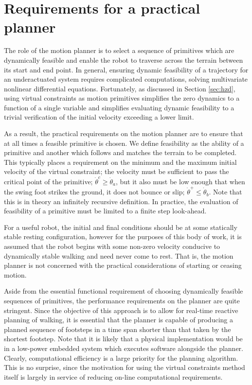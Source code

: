 \section{Requirements for a practical planner}
The role of the motion planner is to select a sequence of primitives which are dynamically feasible and enable the robot to traverse across the terrain between its start and end point. In general, ensuring dynamic feasibility of a trajectory for an underactuated system requires complicated computations, solving multivariate nonlinear differential equations. Fortunately, as discussed in Section \ref{sec:hzd}, using virtual constraints as motion primitives simplifies the zero dynamics to a function of a single variable and simplifies evaluating dynamic feasibility to a trivial verification of the initial velocity exceeding a lower limit.

As a result, the practical requirements on the motion planner are to ensure that at all times a feasible primitive is chosen. We define feasibility as the ability of a primitive and another which follows and matches the terrain to be completed. This typically places a requirement on the minimum and the maximum initial velocity of the virtual constraint; the velocity must be sufficient to pass the critical point of the primitive; $\dot{\theta}^c \geq \dot{\theta}_a$, but it also must be low enough that when the swing foot strikes the ground, it does not bounce or slip; $\dot{\theta}^+ \leq \dot{\theta}_b$. Note that this is in theory an infinitely recursive definition. In practice, the evaluation of feasibility of a primitive must be limited to a finite step look-ahead.

For a useful robot, the initial and final conditions should be at some statically stable resting configuration, however for the purposes of this body of work, it is assumed that the robot begins with some non-zero velocity conducive to dynamically stable walking and need never come to rest. That is, the motion planner is not concerned with the practical considerations of starting or ceasing motion.

Aside from the essential functional requirement of choosing dynamically feasible sequences of primitives, the performance requirements on the planner are quite stringent. Since the objective of this approach is to allow for real-time reactive planning of walking, it is essential that the planner is capable of producing a planned sequence of footsteps in a time span shorter than that taken by the shortest footstep. Note that it is likely that a physical implementation would be in a low-power embedded system which executes software alongside the planner. Clearly, computational efficiency is a large priority for the planning algorithm. This is no surprise, since the motivation for using the virtual constraints method itself is largely in service of reducing on-line computational requirements.

